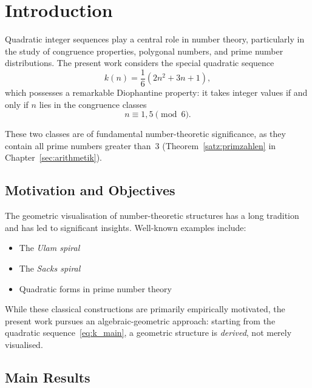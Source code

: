 \chapter{Introduction}

Quadratic integer sequences play a central role in number theory,
particularly in the study of congruence properties, polygonal numbers,
and prime number distributions. The present work considers the special
quadratic sequence
\begin{equation}\label{eq:k_main}
k(n) = \frac{1}{6}(2n^2 + 3n + 1),
\end{equation}
which possesses a remarkable Diophantine property: it takes integer
values if and only if $n$ lies in the congruence classes
\begin{equation}\label{eq:congruence}
n \equiv 1, 5 \pmod{6}.
\end{equation}

These two classes are of fundamental number-theoretic significance, as they
contain all prime numbers greater than~$3$ (Theorem~\ref{satz:primzahlen} in
Chapter~\ref{sec:arithmetik}).

\section*{Motivation and Objectives}

The geometric visualisation of number-theoretic structures has a long
tradition and has led to significant insights. Well-known examples include:
\begin{itemize}[leftmargin=2em]
\item The \emph{Ulam spiral}~\cite{Stein1964}
\item The \emph{Sacks spiral}~\cite{Sacks2003}
\item Quadratic forms in prime number theory
\end{itemize}

While these classical constructions are primarily empirically motivated,
the present work pursues an algebraic-geometric approach:
starting from the quadratic sequence~\eqref{eq:k_main}, a geometric
structure is \emph{derived}, not merely visualised.

\clearpage

\section*{Main Results}

